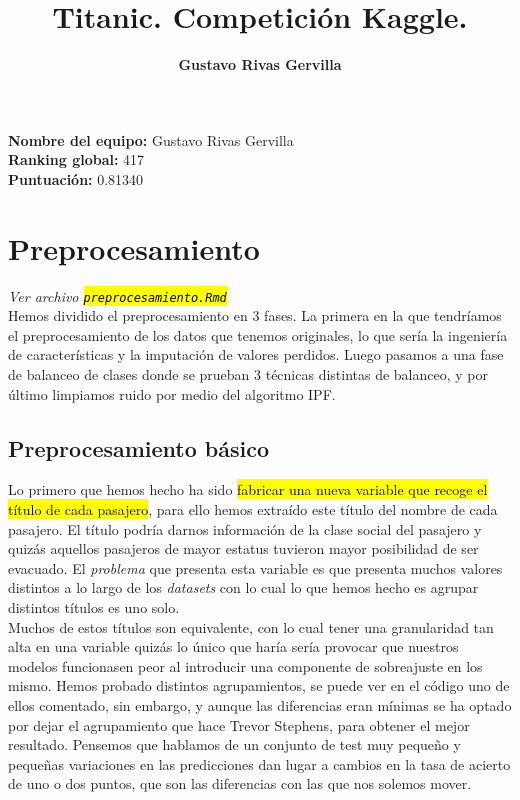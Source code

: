 \documentclass[10pt,a4paper]{article}
\author{\textbf{Gustavo Rivas Gervilla}}
\title{\textcolor{deepblue}{\textbf{Titanic. Competición Kaggle.}}}
\date{}
\newcommand{\emp}[1]{\sethlcolor{light-yellow}\hl{#1}} %
\newcommand{\archive}[1]{\sethlcolor{light-blue}\hl{\texttt{#1}}} %
\begin{document}
\maketitle

\begin{center}
  \textbf{Nombre del equipo: }Gustavo Rivas Gervilla\\
  \textbf{Ranking global: }417\\
  \textbf{Puntuación: }0.81340
\end{center}

\newpage

\tableofcontents

\newpage





\section{Preprocesamiento} \emph{Ver archivo \archive{preprocesamiento.Rmd}}\\

Hemos dividido el preprocesamiento en 3 fases. La primera en la que tendríamos el preprocesamiento de los datos que tenemos originales, lo que sería la ingeniería de características y la imputación de valores perdidos. Luego pasamos a una fase de balanceo de clases donde se prueban 3 técnicas distintas de balanceo, y por último limpiamos ruido por medio del algoritmo IPF.

\subsection{Preprocesamiento básico}


Lo primero que hemos hecho ha sido \emp{fabricar una nueva variable que recoge el título de cada pasajero}, para ello hemos extraído este título del nombre de cada pasajero. El título podría darnos información de la clase social del pasajero y quizás aquellos pasajeros de mayor estatus tuvieron mayor posibilidad de ser evacuado. El \textit{problema} que presenta esta variable es que presenta muchos valores distintos a lo largo de los \textit{datasets} con lo cual lo que hemos hecho es agrupar distintos títulos es uno solo.\\

Muchos de estos títulos son equivalente, con lo cual tener una granularidad tan alta en una variable quizás lo único que haría sería provocar que nuestros modelos funcionasen peor al introducir una componente de sobreajuste en los mismo. Hemos probado distintos agrupamientos, se puede ver en el código uno de ellos comentado, sin embargo, y aunque las diferencias eran mínimas se ha optado por dejar el agrupamiento que hace Trevor Stephens, para obtener el mejor resultado. Pensemos que hablamos de un conjunto de test muy pequeño y pequeñas variaciones en las predicciones dan lugar a cambios en la tasa de acierto de uno o dos puntos, que son las diferencias con las que nos solemos mover.\\
\end{document}
